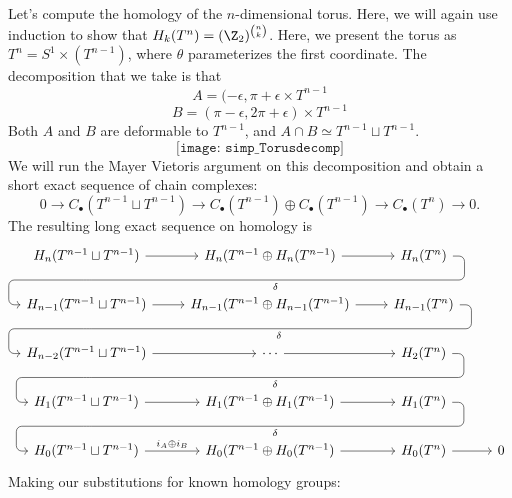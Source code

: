 \begin{doubledpage}
\begin{example}
Let's compute the homology of the $n$-dimensional torus. Here, we will again use induction to show that $H_k(T^n)=(\Z_2)^{n \choose k}$. Here, we present the torus as $T^n= S^1\times (T^{n-1})$, where $\theta$ parameterizes the first coordinate. The decomposition that we take is that 
\[A=(-\epsilon, \pi+\epsilon \times T^{n-1}\]
\[B=(\pi-\epsilon, 2\pi+\epsilon) \times T^{n-1}\]
Both $A$ and $B$ are deformable to $T^{n-1}$, and $A\cap B\simeq T^{n-1}\sqcup T^{n-1}$. 
\[\texttt{[image: simp\_Torusdecomp]}\]
We will run the Mayer Vietoris argument on this decomposition and obtain a short exact sequence of chain complexes:
\[ 0\to C_\bullet(T^{n-1}\sqcup T^{n-1})\to C_\bullet(T^{n-1})\oplus C_\bullet(T^{n-1})\to C_\bullet(T^n)\to 0.\]
The resulting long exact sequence on homology is 
\[
		\begin{tikzcd}
			H_n(T^{n-1}\sqcup T^{n-1}) \arrow{r}\arrow[draw=none]{d}[name=Z, shape=coordinate]{}&H_n(T^{n-1}\oplus H_n(T^{n-1}) \arrow{r}& H_n(T^n) \arrow[rounded corners,to path={ -- ([xshift=2ex]\tikztostart.east)|- (Z) [near end]\tikztonodes-| ([xshift=-2ex]\tikztotarget.west)-- (\tikztotarget)}]{dll}{\delta} \\
			H_{n-1}(T^{n-1}\sqcup T^{n-1}) \arrow{r}\arrow[draw=none]{d}[name=Z, shape=coordinate]{}&H_{n-1}(T^{n-1}\oplus H_{n-1} (T^{n-1})\arrow{r}& H_{n-1}(T^n) \arrow[rounded corners,to path={ -- ([xshift=2ex]\tikztostart.east)|- (Z) [near end]\tikztonodes-| ([xshift=-2ex]\tikztotarget.west)-- (\tikztotarget)}]{dll}{\delta} \\
			H_{n-2}(T^{n-1}\sqcup T^{n-1})\arrow{r}\arrow[draw=none]{d}[name=Z, shape=coordinate]{}&\cdots \arrow{r}& H_2(T^n) \arrow[rounded corners,to path={ -- ([xshift=2ex]\tikztostart.east)|- (Z) [near end]\tikztonodes-| ([xshift=-2ex]\tikztotarget.west)-- (\tikztotarget)}]{dll}{\delta} \\
			H_{1}(T^{n-1}\sqcup T^{n-1})\arrow{r}\arrow[draw=none]{d}[name=Z, shape=coordinate]{}&H_1(T^{n-1}\oplus H_1 (T^{n-1})\arrow{r}& H_1(T^n) \arrow[rounded corners,to path={ -- ([xshift=2ex]\tikztostart.east)|- (Z) [near end]\tikztonodes-| ([xshift=-2ex]\tikztotarget.west)-- (\tikztotarget)}]{dll}{\delta} \\
			H_0(T^{n-1}\sqcup T^{n-1})\arrow{r}{i_A\oplus i_B }&H_{0}(T^{n-1}\oplus H_{0} (T^{n-1}) \arrow{r}& H_0(T^n)\arrow{r}&0
		\end{tikzcd}
\]
Making our substitutions for known homology groups:
\[
\]
\end{example}
\end{doubledpage}
